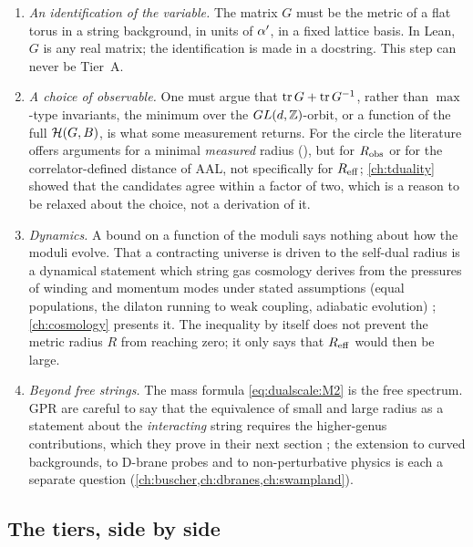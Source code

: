 \begin{enumerate}[leftmargin=*]
\item \emph{An identification of the variable.} The matrix $G$ must be the metric of a flat
 torus in a string background, in units of $\alpha'$, in a fixed lattice basis. In Lean, $G$ is any
 real matrix; the identification is made in a docstring. This step can never be Tier~A.
\item \emph{A choice of observable.} One must argue that $\operatorname{tr} G+\operatorname{tr} G^{-1}$, rather than
 $\max$-type invariants, the minimum over the $GL(d,\mathbb{Z})$-orbit, or a function of the full
 $\mathcal{H}(G,B)$, is what some measurement returns. For the circle the literature offers
 arguments for a minimal \emph{measured} radius (\TL), but for $R_{\rm obs}$ or for the
 correlator-defined distance of AAL, not specifically for $R_{\rm eff}$; \cref{ch:tduality}
 showed that the candidates agree within a factor of two, which is a reason to be relaxed about
 the choice, not a derivation of it.
\item \emph{Dynamics.} A bound on a function of the moduli says nothing about how the moduli
 evolve. That a contracting universe is driven to the self-dual radius is a dynamical statement
 which string gas cosmology derives from the pressures of winding and momentum modes under
 stated assumptions (equal populations, the dilaton running to weak coupling, adiabatic
 evolution) ; \cref{ch:cosmology} presents it. The inequality
 by itself does not prevent the metric radius $R$ from reaching zero; it only says that
 $R_{\rm eff}$ would then be large.
\item \emph{Beyond free strings.} The mass formula \eqref{eq:dualscale:M2} is the free
 spectrum. GPR are careful to say that the equivalence of small and large radius as a statement
 about the \emph{interacting} string requires the higher-genus contributions, which they prove
 in their next section ; the extension to curved backgrounds,
 to D-brane probes and to non-perturbative physics is each a separate question
 (\cref{ch:buscher,ch:dbranes,ch:swampland}).
\end{enumerate}

\subsection{The tiers, side by side}

